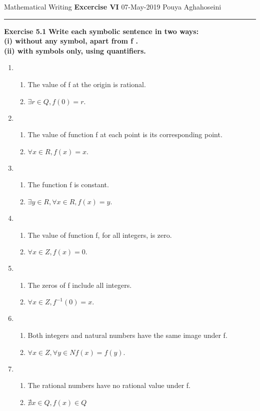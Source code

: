 \documentclass{article}
\begin{document}
	\noindent
	Mathematical Writing \hfill \textbf{Excercise VI} \newline 
	{07-May-2019} \hfill Pouya Aghahoseini
	
	\noindent
	\rule{\linewidth}{0.4pt}
	\textbf{\large\color{blue} Exercise 5.1}   \textbf{Write each symbolic sentence in two ways:\\
		(i) without any symbol, apart from f .\\
		(ii) with symbols only, using quantifiers.}
	
	\begin{enumerate}
		\item 
		\begin{enumerate}[label=\roman*]
			\item The value of f at the origin is rational.
			\item $\exists r \in Q , f(0)=r.$
		\end{enumerate}
		\item
		\begin{enumerate}[label=\roman*]
			\item The value of function f at each point is its corresponding point. 
			\item $\forall x \in R, f(x)=x. $
		\end{enumerate}
		\item
		\begin{enumerate}[label=\roman*]
			\item The function f is constant.
			\item $\exists y \in R, \forall x \in R, f(x)=y. $
		\end{enumerate}
		\item
		\begin{enumerate}[label=\roman*]
			\item  The value of function f, for all integers, is zero.
			\item  $\forall x \in Z, f(x)=0. $
		\end{enumerate}
		\item
		\begin{enumerate}[label=\roman*]
			\item The zeros of f include all integers.
			\item $\forall x \in Z, f^{-1}(0)=x. $
		\end{enumerate}
		\item
		\begin{enumerate}[label=\roman*]
			\item  Both integers and natural numbers have the same image under f.
			\item $\forall x \in Z, \forall y \in N f(x)=f(y). $
		\end{enumerate}
		\item
		\begin{enumerate}[label=\roman*]
			\item The rational numbers have no rational value under f.
			\item $\nexists x \in Q, f(x)\in Q$
		\end{enumerate}
	\end{enumerate}
	
\end{document}
